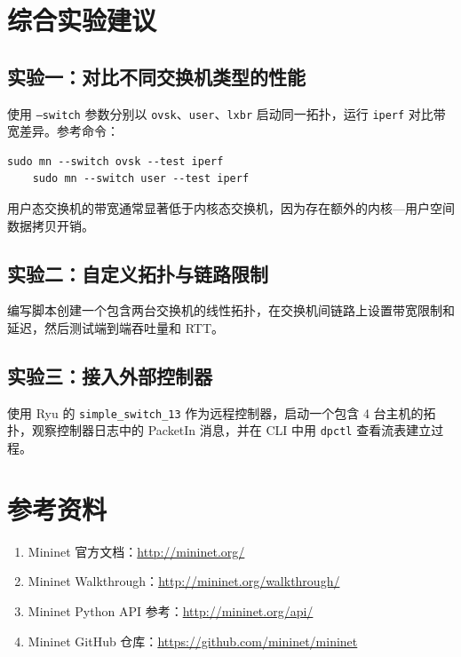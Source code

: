 \documentclass[12pt,a4paper,openany]{ctexbook}
\begin{document}
\chapter{综合实验建议}

\section{实验一：对比不同交换机类型的性能}

使用 \texttt{--switch} 参数分别以 \texttt{ovsk}、\texttt{user}、\texttt{lxbr} 启动同一拓扑，运行 \texttt{iperf} 对比带宽差异。参考命令：

\begin{lstlisting}[style=bashstyle]
	sudo mn --switch ovsk --test iperf
	sudo mn --switch user --test iperf
\end{lstlisting}

用户态交换机的带宽通常显著低于内核态交换机，因为存在额外的内核—用户空间数据拷贝开销。

\section{实验二：自定义拓扑与链路限制}

编写脚本创建一个包含两台交换机的线性拓扑，在交换机间链路上设置带宽限制和延迟，然后测试端到端吞吐量和 RTT。

\section{实验三：接入外部控制器}

使用 Ryu 的 \texttt{simple\_switch\_13} 作为远程控制器，启动一个包含 4 台主机的拓扑，观察控制器日志中的 PacketIn 消息，并在 CLI 中用 \texttt{dpctl} 查看流表建立过程。


\appendix
\chapter{参考资料}

\begin{enumerate}[leftmargin=*]
	\item Mininet 官方文档：\url{http://mininet.org/}
	\item Mininet Walkthrough：\url{http://mininet.org/walkthrough/}
	\item Mininet Python API 参考：\url{http://mininet.org/api/}
	\item Mininet GitHub 仓库：\url{https://github.com/mininet/mininet}
\end{enumerate}
\end{document}
